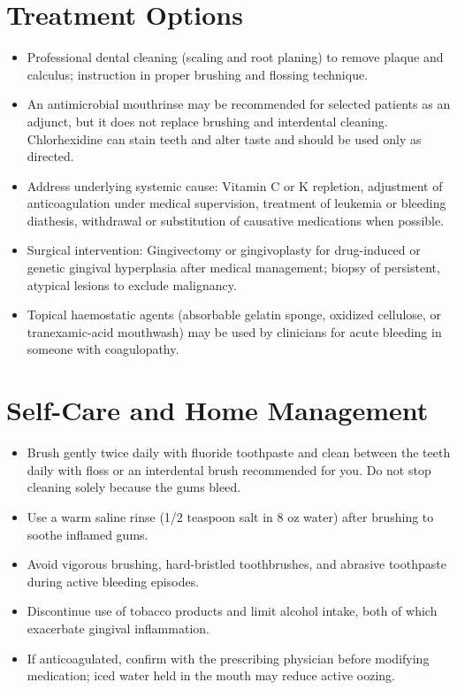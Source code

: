 \section*{Treatment Options}
\begin{itemize}
 \item Professional dental cleaning (scaling and root planing) to remove plaque and calculus; instruction in proper brushing and flossing technique.
 \item An antimicrobial mouthrinse may be recommended for selected patients as an adjunct, but it does not replace brushing and interdental cleaning. Chlorhexidine can stain teeth and alter taste and should be used only as directed.
 \item Address underlying systemic cause: Vitamin C or K repletion, adjustment of anticoagulation under medical supervision, treatment of leukemia or bleeding diathesis, withdrawal or substitution of causative medications when possible.
 \item Surgical intervention: Gingivectomy or gingivoplasty for drug-induced or genetic gingival hyperplasia after medical management; biopsy of persistent, atypical lesions to exclude malignancy.
 \item Topical haemostatic agents (absorbable gelatin sponge, oxidized cellulose, or tranexamic-acid mouthwash) may be used by clinicians for acute bleeding in someone with coagulopathy.
\end{itemize}

\section*{Self-Care and Home Management}
\begin{itemize}
 \item Brush gently twice daily with fluoride toothpaste and clean between the teeth daily with floss or an interdental brush recommended for you. Do not stop cleaning solely because the gums bleed.
 \item Use a warm saline rinse (1/2 teaspoon salt in 8 oz water) after brushing to soothe inflamed gums.
 \item Avoid vigorous brushing, hard-bristled toothbrushes, and abrasive toothpaste during active bleeding episodes.
 \item Discontinue use of tobacco products and limit alcohol intake, both of which exacerbate gingival inflammation.
 \item If anticoagulated, confirm with the prescribing physician before modifying medication; iced water held in the mouth may reduce active oozing.
\end{itemize}

